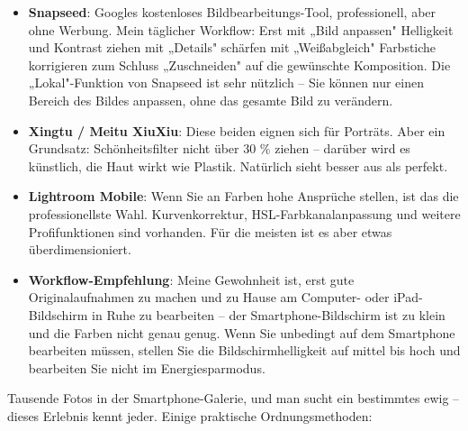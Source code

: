 \begin{itemize}
  \item \textbf{Snapseed}: Googles kostenloses Bildbearbeitungs-Tool, professionell, aber ohne Werbung. Mein täglicher Workflow: Erst mit „Bild anpassen" Helligkeit und Kontrast ziehen mit „Details" schärfen mit „Weißabgleich" Farbstiche korrigieren zum Schluss „Zuschneiden" auf die gewünschte Komposition. Die „Lokal"-Funktion von Snapseed ist sehr nützlich – Sie können nur einen Bereich des Bildes anpassen, ohne das gesamte Bild zu verändern.
  \item \textbf{Xingtu / Meitu XiuXiu}: Diese beiden eignen sich für Porträts. Aber ein Grundsatz: Schönheitsfilter nicht über 30 \% ziehen – darüber wird es künstlich, die Haut wirkt wie Plastik. Natürlich sieht besser aus als perfekt.
  \item \textbf{Lightroom Mobile}: Wenn Sie an Farben hohe Ansprüche stellen, ist das die professionellste Wahl. Kurvenkorrektur, HSL-Farbkanalanpassung und weitere Profifunktionen sind vorhanden. Für die meisten ist es aber etwas überdimensioniert.
  \item \textbf{Workflow-Empfehlung}: Meine Gewohnheit ist, erst gute Originalaufnahmen zu machen und zu Hause am Computer- oder iPad-Bildschirm in Ruhe zu bearbeiten – der Smartphone-Bildschirm ist zu klein und die Farben nicht genau genug. Wenn Sie unbedingt auf dem Smartphone bearbeiten müssen, stellen Sie die Bildschirmhelligkeit auf mittel bis hoch und bearbeiten Sie nicht im Energiesparmodus.
\end{itemize}


Tausende Fotos in der Smartphone-Galerie, und man sucht ein bestimmtes ewig – dieses Erlebnis kennt jeder. Einige praktische Ordnungsmethoden:

